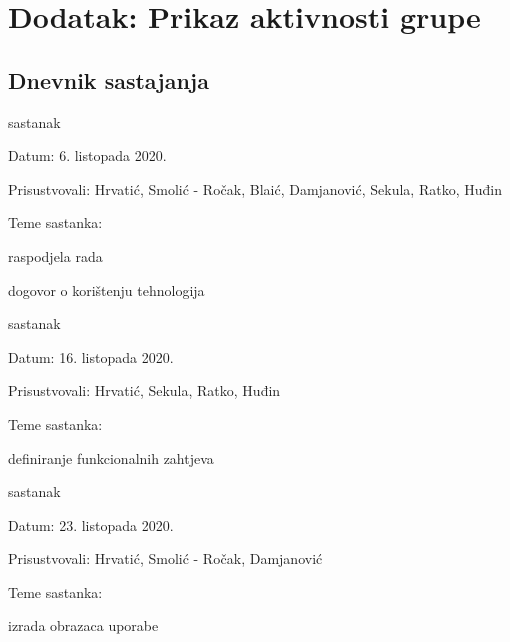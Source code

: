 \chapter*{Dodatak: Prikaz aktivnosti grupe\hfill}
		
		\begin{flushleft}
		\section*{Dnevnik sastajanja}
		\end{flushleft}
		
		
		\begin{packed_enum}
			\item  sastanak
			
			\item[] \begin{packed_item}
				\item Datum: 6. listopada 2020.
				\item Prisustvovali: Hrvatić, Smolić - Ročak, Blaić, Damjanović, Sekula, Ratko, Huđin
				\item Teme sastanka:
				\begin{packed_item}
					\item  raspodjela rada
					\item  dogovor o korištenju tehnologija
				\end{packed_item}
			\end{packed_item}
			
			\item  sastanak
			
			\item[] \begin{packed_item}
				\item Datum: 16. listopada 2020.
				\item Prisustvovali: Hrvatić, Sekula, Ratko, Huđin
				\item Teme sastanka:
				\begin{packed_item}
					\item  definiranje funkcionalnih zahtjeva
				\end{packed_item}
			\end{packed_item}
			
			\item  sastanak
			
			\item[] \begin{packed_item}
				\item Datum: 23. listopada 2020.
				\item Prisustvovali: Hrvatić, Smolić - Ročak, Damjanović
				\item Teme sastanka:
				\begin{packed_item}
					\item  izrada obrazaca uporabe
				\end{packed_item}
			\end{packed_item}
			

\end{packed_enum}
